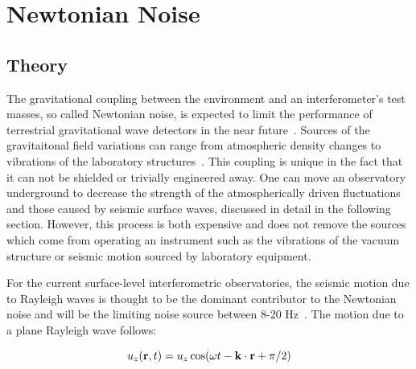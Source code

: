\documentclass [12pt, proquest]{uwthesis}[2019]
\begin{document}
%

\section{Newtonian Noise}
\subsection{Theory}

The gravitational coupling between the environment and an interferometer's test masses, so called Newtonian noise, is expected to limit the performance of terrestrial gravitational wave detectors in the near future~\cite{Saulson}. Sources of the gravitaitonal field variations can range from atmospheric density changes to vibrations of the laboratory structures~\cite{terrestrial}. This coupling is unique in the fact that it can not be shielded or trivially engineered away. One can move an observatory underground to decrease the strength of the atmospherically driven fluctuations and those caused by seismic surface waves, discussed in detail in the following section. However, this process is both expensive and does not remove the sources which come from operating an instrument such as the vibrations of the vacuum structure or seismic motion sourced by laboratory equipment. 

For the current surface-level interferometric observatories, the seismic motion due to Rayleigh waves is thought to be the dominant contributor to the Newtonian noise and will be the limiting noise source between 8-20 Hz~\cite{NN2}. The motion due to a plane Rayleigh wave follows:

\begin{equation}
u_z({\bf r} ,t)=u_z \cos(\omega t-{\bf k}\cdot{\bf r}+\pi/2) \label{uz}
\end{equation}
\end{document}
